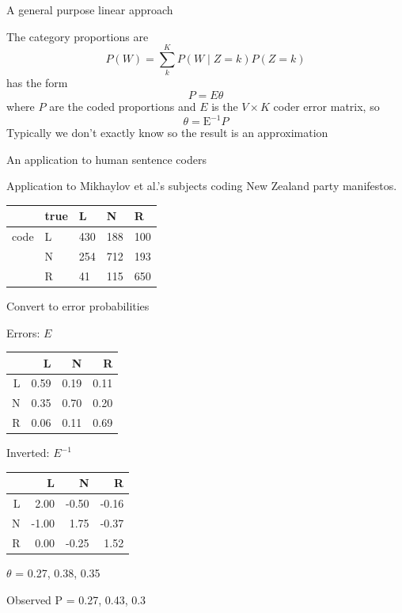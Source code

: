 \documentclass{hertieteaching}
\begin{document}
\begin{frame}{A general purpose linear approach}
\protect\hypertarget{a-general-purpose-linear-approach}{}

The category proportions are \[
P(W) = \sum^K_k {P(W \mid Z=k)} P(Z=k)
\] has the form \[
P = E \theta
\] where \(P\) are the coded proportions and \(E\) is the \(V \times K\)
coder error matrix, so \[
\theta = \text{E}^{-1} P
\] Typically we don't exactly know  so the result is an
approximation

\end{frame}

\begin{frame}{An application to human sentence coders}
\protect\hypertarget{an-application-to-human-sentence-coders}{}

Application to Mikhaylov et al.'s subjects coding New Zealand party
manifestos.

\begin{longtable}[]{@{}lllll@{}}
\toprule
& true & L & N & R\tabularnewline
\midrule
\endhead
code & L & 430 & 188 & 100\tabularnewline
& N & 254 & 712 & 193\tabularnewline
& R & 41 & 115 & 650\tabularnewline
\bottomrule
\end{longtable}

\end{frame}

\begin{frame}{Convert to error probabilities}
\protect\hypertarget{convert-to-error-probabilities}{}

Errors: \(E\)

\begin{table}[ht]
\centering
\begin{tabular}{rrrr}
  \toprule
 & L & N & R \\ 
  \midrule
L & 0.59 & 0.19 & 0.11 \\ 
  N & 0.35 & 0.70 & 0.20 \\ 
  R & 0.06 & 0.11 & 0.69 \\ 
   \bottomrule
\end{tabular}
\end{table}

\pause

Inverted: \(E^{-1}\)

\begin{table}[ht]
\centering
\begin{tabular}{rrrr}
  \toprule
 & L & N & R \\ 
  \midrule
L & 2.00 & -0.50 & -0.16 \\ 
  N & -1.00 & 1.75 & -0.37 \\ 
  R & 0.00 & -0.25 & 1.52 \\ 
   \bottomrule
\end{tabular}
\end{table}

\pause

\(\theta\) = 0.27, 0.38, 0.35

\pause

Observed P = 0.27, 0.43, 0.3

\end{frame}
\end{document}
